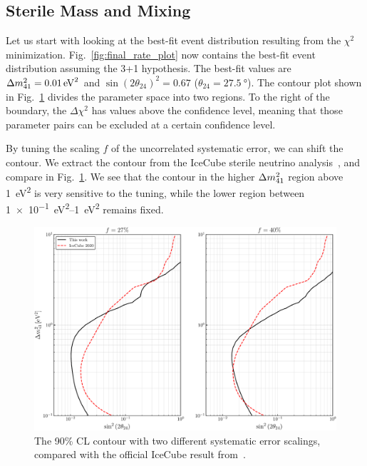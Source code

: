 \subsection{Sterile Mass and Mixing}
Let us start with looking at the best-fit event distribution resulting from the $\chi^2$ minimization.
Fig.~\ref{fig:final_rate_plot} now contains the best-fit event distribution assuming the 3+1 hypothesis.
The best-fit values are $\dm[41] = \SI{0.01}{\eV\squared}$ and 
$\sin(2\theta_{24})^2 = 0.67$ ($\theta_{24} = \SI{27.5}{\degree}$). %
The contour plot shown in Fig.~\ref{fig:error_tuning} divides the parameter space into two regions.
To the right of the boundary, the $\Delta \chi^2$ has values above the confidence level, meaning that 
those parameter pairs can be excluded at a certain confidence level.

By tuning the scaling $f$ of the uncorrelated systematic error, we can shift the contour. We extract the contour from the 
IceCube sterile neutrino analysis~\cite{IC2020}, and compare in Fig.~\ref{fig:error_tuning}. We see that the contour in the 
higher $\dm[41]$ region above \SI{1}{\eV\squared} is very sensitive to the tuning, while the lower region between \SIrange[]{1e-1}{1}{\eV\squared}
remains fixed.
\begin{figure}
    \centering
    \includegraphics[scale=0.58]{figures/s24_error_tuning.pdf}
    \caption{The 90\% CL contour with two different systematic error scalings, compared 
    with the official IceCube result from~\cite{IC2020}.}\label{fig:error_tuning}
\end{figure}

